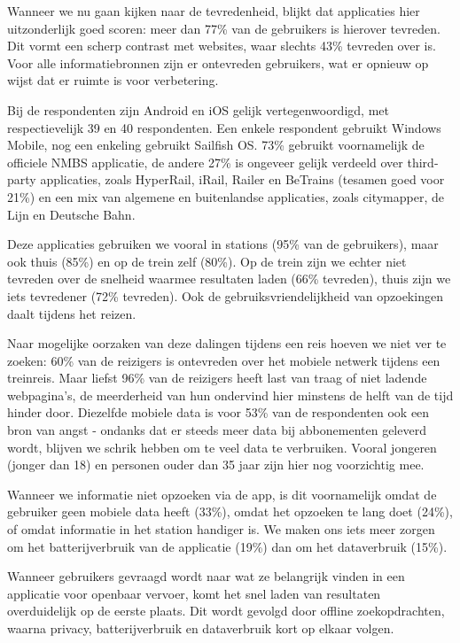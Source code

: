 Wanneer we nu gaan kijken naar de tevredenheid, blijkt dat applicaties hier uitzonderlijk goed scoren: meer dan 77\% van de gebruikers is hierover tevreden. Dit vormt een scherp contrast met websites, waar slechts 43\% tevreden over is. Voor alle informatiebronnen zijn er ontevreden gebruikers, wat er opnieuw op wijst dat er ruimte is voor verbetering.

Bij de respondenten zijn Android en iOS gelijk vertegenwoordigd, met respectievelijk 39 en 40 respondenten. Een enkele respondent gebruikt Windows Mobile, nog een enkeling gebruikt Sailfish OS. 73\% gebruikt voornamelijk de officiele NMBS applicatie, de andere 27\% is ongeveer gelijk verdeeld over third-party applicaties, zoals HyperRail, iRail, Railer en BeTrains (tesamen goed voor 21\%) en een mix van algemene en buitenlandse applicaties, zoals citymapper, de Lijn en Deutsche Bahn.

Deze applicaties gebruiken we vooral in stations (95\% van de gebruikers), maar ook thuis (85\%) en op de trein zelf (80\%). Op de trein zijn we echter niet tevreden over de snelheid waarmee resultaten laden (66\% tevreden), thuis zijn we iets tevredener (72\% tevreden). Ook de gebruiksvriendelijkheid van opzoekingen daalt tijdens het reizen. 

Naar mogelijke oorzaken van deze dalingen tijdens een reis hoeven we niet ver te zoeken: 60\% van de reizigers is ontevreden over het mobiele netwerk tijdens een treinreis. Maar liefst 96\% van de reizigers heeft last van traag of niet ladende webpagina's, de meerderheid van hun ondervind hier minstens de helft van de tijd hinder door. Diezelfde mobiele data is voor 53\% van de respondenten ook een bron van angst - ondanks dat er steeds meer data bij abbonementen geleverd wordt, blijven we schrik hebben om te veel data te verbruiken. Vooral jongeren (jonger dan 18) en personen ouder dan 35 jaar zijn hier nog voorzichtig mee.

Wanneer we informatie niet opzoeken via de app, is dit voornamelijk omdat de gebruiker geen mobiele data heeft (33\%), omdat het opzoeken te lang doet (24\%), of omdat informatie in het station handiger is. We maken ons iets meer zorgen om het batterijverbruik van de applicatie (19\%) dan om het dataverbruik (15\%).

Wanneer gebruikers gevraagd wordt naar wat ze belangrijk vinden in een applicatie voor openbaar vervoer, komt het snel laden van resultaten overduidelijk op de eerste plaats. Dit wordt gevolgd door offline zoekopdrachten, waarna privacy, batterijverbruik en dataverbruik kort op elkaar volgen.

